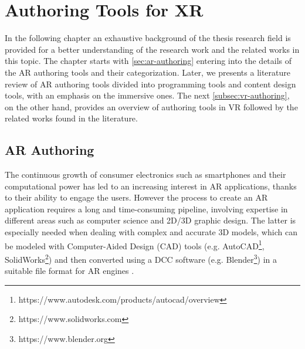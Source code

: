 \section{Authoring Tools for XR}
\label{sec:background-authoring}
In the following chapter an exhaustive background of the thesis research field is provided for a better understanding of the research work and the related works in this topic. The chapter starts with \autoref{sec:ar-authoring} entering into the details of the AR authoring tools and their categorization. Later, we presents a literature review of AR authoring tools divided into programming tools and content design tools, with an emphasis on the immersive ones. The next \autoref{subsec:vr-authoring}, on the other hand, provides an overview of authoring tools in VR followed by the related works found in the literature. 

\subsection{AR Authoring}
\label{sec:ar-authoring}
The continuous growth of consumer electronics such as smartphones and their computational power has led to an increasing interest in AR applications, thanks to their ability to engage the users.
However the process to create an AR application requires a long and time-consuming pipeline, involving expertise in different areas such as computer science and 2D/3D graphic design. The latter is especially needed when dealing with complex and accurate 3D models, which can be modeled with Computer-Aided Design (CAD) tools (e.g. AutoCAD\footnote{https://www.autodesk.com/products/autocad/overview}, SolidWorks\footnote{https://www.solidworks.com}) and then converted using a DCC software (e.g. Blender\footnote{https://www.blender.org}) in a suitable file format for AR engines \cite{de_paolis_waat_2020}.

